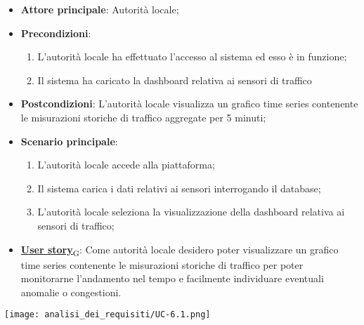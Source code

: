 \begin{itemize}
	\item \textbf{Attore principale}: Autorità locale;
	\item \textbf{Precondizioni}:
	      \begin{enumerate}
		      \item L'autorità locale ha effettuato l'accesso al sistema ed esso è in funzione;
		      \item Il sistema ha caricato la dashboard relativa ai sensori di traffico
	      \end{enumerate}
	\item \textbf{Postcondizioni}: L'autorità locale visualizza un grafico time series contenente le misurazioni storiche
	      di traffico aggregate per 5 minuti;
	\item \textbf{Scenario principale}:
	      \begin{enumerate}
		      \item L'autorità locale accede alla piattaforma;
		      \item Il sistema carica i dati relativi ai sensori interrogando il database;
		      \item L'autorità locale seleziona la visualizzazione della dashboard relativa ai sensori di traffico;
	      \end{enumerate}
	\item \href{https://7last.github.io/docs/rtb/documentazione-interna/glossario\#user-story}{\textbf{User story}\textsubscript{G}}:
	      Come autorità locale desidero poter visualizzare un grafico time series contenente le misurazioni storiche
	      di traffico per poter monitorarne l'andamento nel tempo e facilmente individuare eventuali anomalie
	      o congestioni.
\end{itemize}
\begin{center}
	\texttt{[image: analisi\_dei\_requisiti/UC-6.1.png]}
\end{center}

